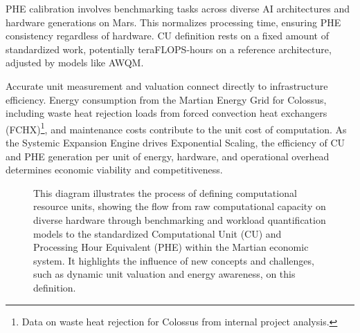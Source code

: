 \documentclass[fontsize=10pt, oneside, DIV=calc]{scrartcl}
\begin{document}
\medskip

\noindent
PHE calibration involves benchmarking tasks across diverse AI architectures and hardware generations on Mars. This normalizes processing time, ensuring PHE consistency regardless of hardware. CU definition rests on a fixed amount of standardized work, potentially teraFLOPS-hours on a reference architecture, adjusted by models like AWQM.

\medskip

\noindent
Accurate unit measurement and valuation connect directly to infrastructure efficiency. Energy consumption from the Martian Energy Grid for Colossus, including waste heat rejection loads from forced convection heat exchangers (FCHX)\footnote{Data on waste heat rejection for Colossus from internal project analysis.}, and maintenance costs contribute to the unit cost of computation. As the Systemic Expansion Engine drives Exponential Scaling, the efficiency of CU and PHE generation per unit of energy, hardware, and operational overhead determines economic viability and competitiveness.

\medskip

\noindent


\begin{figure}[H]
  \centering
  \noindent
  \begin{minipage}{\textwidth}
    \centering
    \caption{This diagram illustrates the process of defining computational resource units, showing the flow from raw computational capacity on diverse hardware through benchmarking and workload quantification models to the standardized Computational Unit (CU) and Processing Hour Equivalent (PHE) within the Martian economic system. It highlights the influence of new concepts and challenges, such as dynamic unit valuation and energy awareness, on this definition.}
  \end{minipage}
\end{figure}
\end{document}
